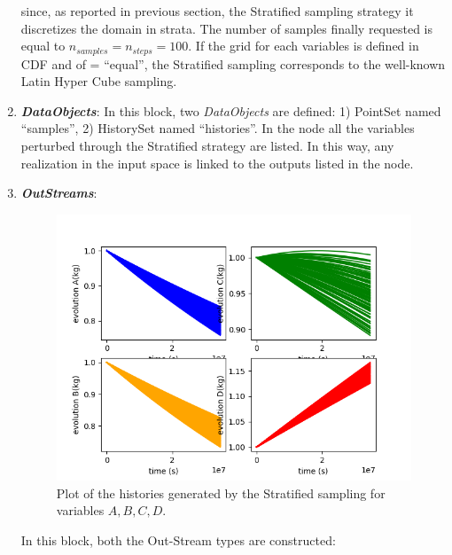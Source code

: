\begin{enumerate}
  since, as reported in previous section, the Stratified sampling strategy it discretizes the domain in strata.
  The number of samples finally requested is equal to $n_{samples} = n_{steps} = 100$.
  If the grid for each variables is defined in CDF and of   = ``equal'', the Stratified
  sampling corresponds to the well-known Latin Hyper Cube sampling.
   \item \textbf{\textit{DataObjects}}:
  In this block, two \textit{DataObjects} are defined: 1) PointSet named
  ``samples'', 2) HistorySet named ``histories''.
  In the  node all the variables
  perturbed through the Stratified strategy are listed. In this way, any
  realization in the input space is linked to the outputs listed in  the
   node.
   \item \textbf{\textit{OutStreams}}:
 \begin{figure}[h!]
  \centering
  \includegraphics[scale=0.7]{../../tests/framework/user_guide/ForwardSamplingStrategies/gold/RunDir/Stratified/1-historyPlot_line-line-line-line.png}
  \caption{Plot of the histories generated by the Stratified sampling for variables $A,B,C,D$.}
  \label{fig:historiesStratifiedPlotLine}
 \end{figure}
  In this block, both the Out-Stream types are constructed:

\end{enumerate}
